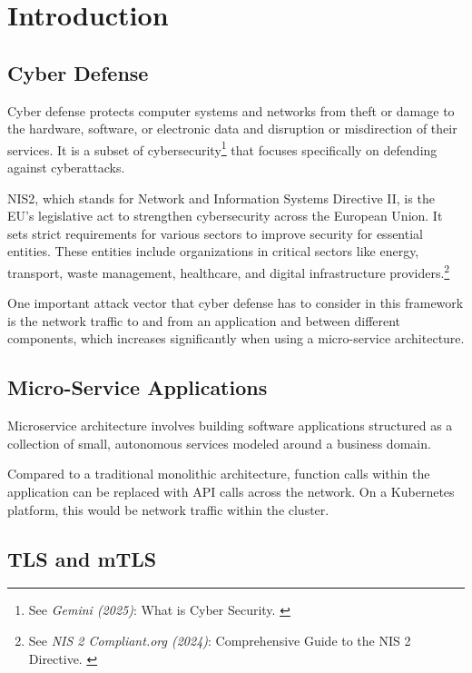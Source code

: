 %
%

\pagebreak
\section{Introduction}

\onehalfspacing

\subsection{Cyber Defense}

Cyber defense protects computer systems and networks from theft or damage to the hardware, software, or electronic data and disruption or misdirection of their services. It is a subset of cybersecurity\footnote{See \textit{Gemini (2025)}: What is Cyber Security. \cite{bardCybersec}} that focuses specifically on defending against cyberattacks.

NIS2, which stands for Network and Information Systems Directive II, is the EU's legislative act to strengthen cybersecurity across the European Union. It sets strict requirements for various sectors to improve security for essential entities. These entities include organizations in critical sectors like energy, transport, waste management, healthcare, and digital infrastructure providers.\footnote{See \textit{NIS 2 Compliant.org (2024)}: Comprehensive Guide to the NIS 2 Directive. \cite{nisGuide}}

One important attack vector that cyber defense has to consider in this framework is the network traffic to and from an application and between different components, which increases significantly when using a micro-service architecture.

\subsection{Micro-Service Applications}

Microservice architecture involves building software applications structured as a collection of small, autonomous services modeled around a business domain.

Compared to a traditional monolithic architecture, function calls within the application can be replaced with API calls across the network. On a Kubernetes platform, this would be network traffic within the cluster.

\subsection{TLS and mTLS}


